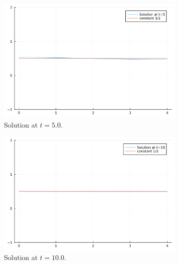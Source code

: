 \documentclass[12pt]{report}
\begin{document}
\begin{solution}
\begin{figure}[H]
\begin{subfigure}[b]{0.45\linewidth}
            \includegraphics[width=\linewidth]{images/3-3.png}
            \caption{Solution at $t=5.0$.}
            \label{3sol:c}
            \vspace{4ex}
        \end{subfigure}
        \begin{subfigure}[b]{0.45\linewidth}
            \centering
            \includegraphics[width=\linewidth]{images/3-4.png}
            \caption{Solution at $t=10.0$.}
            \label{3sol:d}
            \vspace{4ex}
        \end{subfigure}
        \begin{subfigure}[b]{0.45\linewidth}
            \centering

\end{subfigure}
\end{figure}
\end{solution}
\end{document}
